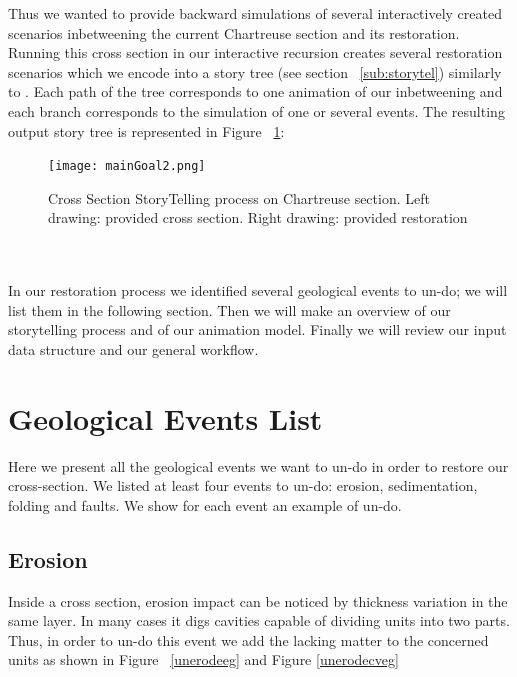 \documentclass[12pt, a4paper]{report} %
\begin{document}
Thus we wanted to provide backward simulations of several interactively created scenarios inbetweening the current Chartreuse section and its restoration. Running this cross section in our interactive recursion creates several restoration scenarios which we encode into a story tree (see section ~\ref{sub:storytel}) similarly to \cite{lidal}. Each path of the tree corresponds to one animation of our inbetweening and each branch corresponds to the simulation of one or several events. The resulting output story tree is represented in Figure ~\ref{maingoal}:
 \begin{figure}[H]
	\centering
	\texttt{[image: mainGoal2.png]}
	\caption{Cross Section StoryTelling process on Chartreuse section. Left drawing: provided cross section. Right drawing: provided restoration}
	\label{maingoal}
\end{figure}\\\\
In our restoration process we identified several geological events to un-do; we will list them in the following section.
Then we will make an overview of our storytelling process and of our animation model. Finally we will review our input data structure and our general workflow.

\section{Geological Events List}
Here we present all the geological events we want to un-do in order to restore our cross-section.
We listed at least four events to un-do: erosion, sedimentation, folding and faults. We show for each event an example of un-do.
\subsection{Erosion}
Inside a cross section, erosion impact can be noticed by thickness variation in the same layer.
In many cases it digs cavities capable of dividing units into two parts. Thus, in order to un-do this event we add the lacking matter to the concerned units as shown in Figure ~\ref{unerodeeg} and Figure \ref{unerodecveg}
\end{document}
